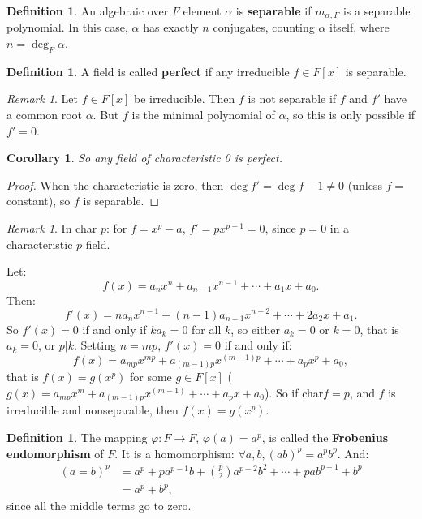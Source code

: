 \documentclass[9pt,reqno,twoside]{amsbook}
\theoremstyle{plain}
\numberwithin{section}{chapter}
\numberwithin{equation}{chapter}
\newtheorem{Cor}[theorem]{Corollary}
\theoremstyle{definition}
\newtheorem{Def}[theorem]{Definition}
\theoremstyle{remark}
\newtheorem{rem}[theorem]{Remark}
\theoremstyle{plain}
\newcommand{\bee}{\begin{equation}\begin{aligned}}
\newcommand{\eee}{\end{aligned}\end{equation}}
\renewcommand{\phi}{\varphi}
\begin{document}
\begin{Def}
An algebraic over $F$ element $\alpha$ is \textbf{separable} if $m_{\alpha,F}$ is a separable polynomial. In this case, $\alpha$ has exactly $n$ conjugates, counting $\alpha$ itself, where $n = \deg_F \alpha$. 
\end{Def}

\begin{Def}
A field is called \textbf{perfect} if any irreducible $f \in F[x]$ is separable. 
\end{Def}

\begin{rem}
Let $f \in F[x]$ be irreducible. Then $f$ is not separable if $f$ and $f'$ have a common root $\alpha$. But $f$ is the minimal polynomial of $\alpha$, so this is only possible if $f' = 0$. 
\end{rem}

\begin{Cor}
So any field of characteristic 0 is perfect.  
\end{Cor}
\begin{proof}
When the characteristic is zero, then $\deg f' = \deg f - 1 \neq 0$ (unless $f = $ constant), so $f$ is separable. 
\end{proof}


\begin{rem}
In char $p$: for $f = x^p - a$, $f' = px^{p - 1} = 0$, since $p = 0$ in a characteristic $p$ field. 
\end{rem}

Let:
$$
f(x) = a_nx^n + a_{n - 1}x^{n - 1} + \cdots + a_1x + a_0.
$$
 Then:
 $$
 f'(x) = na_nx^{n - 1} + (n - 1)a_{n - 1}x^{n - 2} + \cdots + 2a_2x  + a_1.
 $$
  So $f'(x) = 0$ if and only if $ka_k = 0$ for all $k$, so either $a_k = 0$ or $k = 0$, that is $a_k = 0$, or $p|k$. Setting $n = mp$, $f'(x) = 0$ if and only if:
  $$
  f(x) = a_{mp}x^{mp} + a_{(m - 1)p}x^{(m - 1)p} + \cdots + a_px^p + a_0,
  $$ 
  that is $f(x) = g(x^p)$ for some $g \in F[x]$ ($g(x) = a_{mp}x^{m} + a_{(m - 1)p}x^{(m - 1)} + \cdots + a_px + a_0$). So if char$f = p$, and $f$ is irreducible and nonseparable, then $f(x) = g(x^p)$. 

\begin{Def}
The mapping $\phi:F \to F$, $\phi(a) = a^p$, is called the \textbf{Frobenius endomorphism} of $F$. It is a homomorphism: $\forall a,b, (ab)^p = a^pb^p$. And:
\bee
(a = b)^p &= a^p + pa^{p - 1}b + \binom{p}{2}a^{p - 2}b^2 + \cdots + pab^{p - 1} + b^p\\
&= a^p + b^p,
\eee
since all the middle terms go to zero. 
\end{Def}
\end{document}
